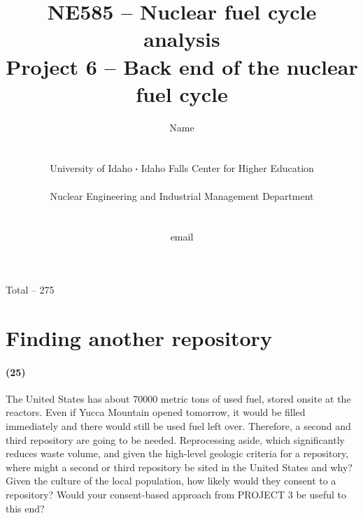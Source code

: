 \documentclass[11pt,a4paper]{article}
\newcommand*\sq{\mathbin{\vcenter{\hbox{\rule{.3ex}{.3ex}}}}} %
\begin{document}
\begin{titlepage}
    \title{
        NE585 -- Nuclear fuel cycle analysis\\
        Project 6 -- Back end of the nuclear fuel cycle\\
    }
    \author{
        Name
        \\ \\ \\
        University of Idaho $\sq$ Idaho Falls Center for Higher Education
        \\ \\
        Nuclear Engineering and Industrial Management Department
        \\ \\ \\
        email 
    }
\clearpage %
\maketitle
\vspace*{\fill}
\begin{flushright}{
        Total -- 275
}
\end{flushright}
\thispagestyle{empty} %
\end{titlepage}

\printnoidxglossary

\newpage

\section{Finding another repository}
\paragraph*{(25)}
The United States has about 70000 metric tons of used fuel, stored onsite at the reactors. Even if Yucca Mountain opened tomorrow, it would be filled immediately and there would still be used fuel left over. Therefore, a second and third repository are going to be needed. Reprocessing aside, which significantly reduces waste volume, and given the high-level geologic criteria for a repository, where might a second or third repository be sited in the United States and why? Given the culture of the local population, how likely would they consent to a repository? Would your consent-based approach from PROJECT 3 be useful to this end?
\end{document}
